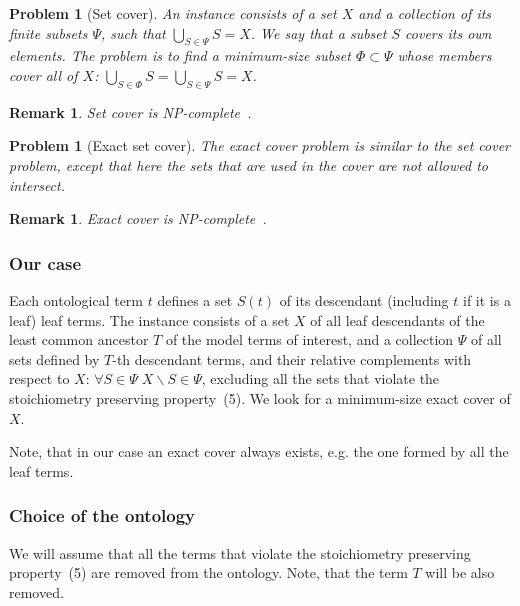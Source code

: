 \documentclass[10pt]{bmc_article}
\newenvironment{bmcformat}{\baselineskip20pt\sloppy\setboolean{publ}{false}}{\baselineskip20pt\sloppy}
\begin{document}
\begin{bmcformat}
\newtheorem{setc}{Problem}
\begin{setc}[Set cover]
An instance consists of a set $X$ and a collection of its finite subsets $\Psi$, such that $\bigcup_{S \in \Psi} S = X$. We say that a subset $S$ covers its own elements. The problem is to find a minimum-size subset $\Phi \subset \Psi$ whose members cover all of $X$: $\bigcup_{S \in \Phi} S = \bigcup_{S \in \Psi} S = X$.
\end{setc}
\newtheorem{rem}{Remark}
\begin{rem}
 Set cover is \textit{NP}-complete~\cite{Cormen2001}.
\end{rem}

\newtheorem{esetc}{Problem}
\begin{esetc}[Exact set cover]
The exact cover problem is similar to the set cover problem, except that here the sets that are used in the cover are not allowed to intersect. 
\end{esetc}
\newtheorem{rem1}{Remark}
\begin{rem1}
Exact cover is \textit{NP}-complete~\cite{Goldreich2008}.
\end{rem1}

\subsubsection*{Our case}
Each ontological term $t$ defines a set $S(t)$ of its descendant (including $t$ if it is a leaf) leaf terms. The instance consists of a set $X$ of all leaf descendants of the least common ancestor $T$ of the model terms of interest, and a collection $\Psi$ of all sets defined by $T$-th descendant terms, and their relative complements with respect to $X$: $\forall S \in \Psi \; X\backslash S \in \Psi$, excluding all the sets that violate the stoichiometry preserving property~(5). We look for a minimum-size exact cover of $X$. 

Note, that in our case an exact cover always exists, e.g. the one formed by all the leaf terms.

\subsubsection*{Choice of the ontology}
We will assume that all the terms that violate the stoichiometry preserving property~(5) are removed from the ontology. Note, that the term $T$ will be also removed.



\end{bmcformat}
\end{document}
